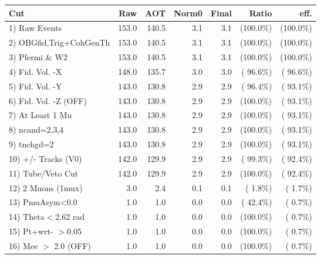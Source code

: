  \begin{table}[h!]\centering
 \begin{tabular}{||l||r|r|r|r|r|r||}
 \hline
 \hline
 Cut & Raw & AOT & Norm0 & Final & Ratio & eff.       \\
 \hline
  1) Raw Events           &        153.0 &        140.5 &          3.1 &          3.1 & (100.0\%) & (100.0\%) \\
  2) OBGfid,Trig+CohGenTh &        153.0 &        140.5 &          3.1 &          3.1 & (100.0\%) & (100.0\%) \\
  3) Pfermi \& W2         &        153.0 &        140.5 &          3.1 &          3.1 & (100.0\%) & (100.0\%) \\
  4) Fid. Vol. -X         &        148.0 &        135.7 &          3.0 &          3.0 & ( 96.6\%) & ( 96.6\%) \\
  5) Fid. Vol. -Y         &        143.0 &        130.8 &          2.9 &          2.9 & ( 96.4\%) & ( 93.1\%) \\
  6) Fid. Vol. -Z (OFF)   &        143.0 &        130.8 &          2.9 &          2.9 & (100.0\%) & ( 93.1\%) \\
  7) At Least 1 Mu        &        143.0 &        130.8 &          2.9 &          2.9 & (100.0\%) & ( 93.1\%) \\
  8) ncand=2,3,4          &        143.0 &        130.8 &          2.9 &          2.9 & (100.0\%) & ( 93.1\%) \\
  9) tnchgd=2             &        143.0 &        130.8 &          2.9 &          2.9 & (100.0\%) & ( 93.1\%) \\
 10) +/- Tracks (V0)      &        142.0 &        129.9 &          2.9 &          2.9 & ( 99.3\%) & ( 92.4\%) \\
 11) Tube/Veto Cut        &        142.0 &        129.9 &          2.9 &          2.9 & (100.0\%) & ( 92.4\%) \\
 12) 2 Muons (1mux)       &          3.0 &          2.4 &          0.1 &          0.1 & (  1.8\%) & (  1.7\%) \\
 13) PmuAsym<0.0          &          1.0 &          1.0 &          0.0 &          0.0 & ( 42.4\%) & (  0.7\%) \\
 14) Theta$<$2.62 rad     &          1.0 &          1.0 &          0.0 &          0.0 & (100.0\%) & (  0.7\%) \\
 15) Pt+wrt- $>$0.05      &          1.0 &          1.0 &          0.0 &          0.0 & (100.0\%) & (  0.7\%) \\
 16) Mee $>$ 2.0  (OFF)   &          1.0 &          1.0 &          0.0 &          0.0 & (100.0\%) & (  0.7\%) \\

\end{tabular}
\end{table}
